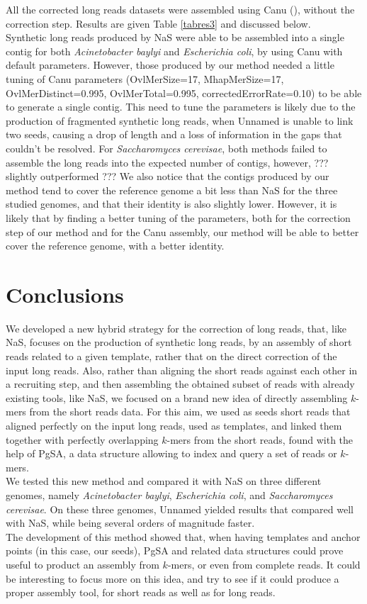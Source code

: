 \documentclass{bioinfo}
\begin{document}
All the corrected long reads datasets were assembled using Canu (\cite{Koren2016}), without the correction step. Results are given Table \ref{tabres3} and discussed below. \\
\indent Synthetic long reads produced by NaS were able to be assembled into a single contig for both \emph{Acinetobacter baylyi} and \emph{Escherichia coli}, by using Canu with default parameters. However, those produced by our method needed a little tuning of Canu parameters (OvlMerSize=17, MhapMerSize=17, OvlMerDistinct=0.995, OvlMerTotal=0.995, correctedErrorRate=0.10) to be able to generate a single contig. This need to tune the parameters is likely due to the production of fragmented synthetic long reads, when Unnamed is unable to link two seeds, causing a drop of length and a loss of information in the gaps that couldn't be resolved. For \emph{Saccharomyces cerevisae}, both methods failed to assemble the long reads into the expected number of contigs, however, ??? slightly outperformed ??? We also notice that the contigs produced by our method tend to cover the reference genome a bit less than NaS for the three studied genomes, and that their identity is also slightly lower. However, it is likely that by finding a better tuning of the parameters, both for the correction step of our method and for the Canu assembly, our method will be able to better cover the reference genome, with a better identity. 
		

\section{Conclusions}
\label{sec:conclusions}

We developed a new hybrid strategy for the correction of long reads, that, like NaS, focuses on the production of synthetic long reads, by an assembly of short reads related to a given template, rather that on the direct correction of the input long reads. Also, rather than aligning the short reads
against each other in a recruiting step, and then assembling the obtained subset of reads with already existing tools, like NaS, we focused on a brand new idea of directly assembling $k$-mers from the short reads data. For this aim, we used as seeds short reads that aligned perfectly on the input long reads, used as templates, and linked them together with perfectly overlapping $k$-mers from the short reads, found with the help of PgSA, a data structure allowing to index and query a set of reads or $k$-mers. \\
\indent We tested this new method and compared it with NaS on three different genomes, namely \emph{Acinetobacter baylyi}, \emph{Escherichia coli}, and \emph{Saccharomyces cerevisae}. On these three genomes, Unnamed yielded results that compared well with NaS, while being several orders of magnitude faster. \\
\indent The development of this method showed that, when having templates and anchor points (in this case, our seeds), PgSA and related data structures could prove useful to product an assembly from $k$-mers, or even from complete reads. It could be interesting to focus more on this idea, and try to see if it could produce a proper assembly tool, for short reads as well as for long reads. 
\end{document}
